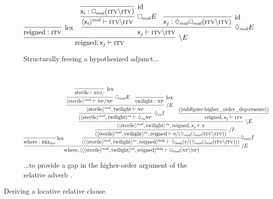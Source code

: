 \begin{figure}
	\begin{subfigure}{1\textwidth}
		\smaller
		\[
			\infer[\divleft E]{\w{reigned}, \varj \vdash \gtype{itv}}{
				\infer[\Lex]{\w{reigned} : \gtype{itv}}{}
				&
				\infer[\ddia{mod}E]{\varj \vdash \gtype{itv}\divleft\gtype{itv}}{
					\infer[\dbox{mod}E]{\dbra{\vari}{mod} \vdash \gtype{itv}\divleft\gtype{itv}}{
						\infer[\Ax]{\vari : \dbox{mod}(\gtype{itv}\divleft\gtype{itv})}{}
					}
					&
					\infer[\Ax]{\varj : \ddia{mod}\dbox{mod}(\gtype{itv}\divleft\gtype{itv})}{}
				}
			}
		\]
		\caption{Structurally freeing a hypothesized adjunct...}	
		\label{subfigure:higher_order_dep:erasure}
	\end{subfigure}\\[\midsep]
	\begin{subfigure}{1\textwidth}
		\smaller
		\[
			\infer[\!\divright E]{\w{where}, \dbra{\dbra{\dbra{\w{sterile}}{mod}, \w{twilight}}{su}, \w{reigned}}{body} \vdash \dbox{mod}(\np\divleft\np)}{
 				\infer[\!\!\Lex]{\w{where} : \subcat{l}{rel}{loc}}{}
				&
				\hspace{-5pt}
				\infer[\!\!\ddia{body}I]{\dbra{\dbra{\dbra{\w{sterile}}{mod}, \w{twilight}}{su}, \w{reigned}}{body} \vdash \ddia{body}(\s\divright(\ddia{mod}\dbox{mod}(\gtype{itv}\divleft\gtype{itv})))}{
					\infer[\divright I]{\dbra{\dbra{\w{sterile}}{mod}, \w{twilight}}{su}, \w{reigned} \vdash \s\divright(\ddia{mod}\dbox{mod}(\gtype{itv}\divleft\gtype{itv}))}{
						\infer[\divleft E]{\dbra{\dbra{\w{sterile}}{mod}, \w{twilight}}{su}, \w{reigned}, \varj \vdash \s}{
							\infer[\ddia{su}I]{\dbra{\dbra{\w{sterile}}{mod}, \w{twilight}}{su} \vdash \ddia{su}\np}{
								\infer[\divright E]{\dbra{\w{sterile}}{mod}, \w{twilight} \vdash \np}{
									\infer[\dbox{mod}E]{\dbra{\w{sterile}}{mod} \vdash \np\divright\np}{
										\infer[\Lex]{\w{sterile} : \gtype{adj}_{\divright}}{}
									}
									&
									\infer[\Lex]{\w{twilight}: \np}{}
								}
							}
							&
							\infer{\w{reigned}, \varj \vdash \gtype{itv}}{\text{(\ref{subfigure:higher_order_dep:erasure})}}
						}
					}
				}
			}
		\]
		\caption{...to provide a gap in the higher-order argument of the relative adverb .}
		\label{subfigure:higher_order_dep:rc}
	\end{subfigure}
	\caption{Deriving a locative relative clause.}
	\label{figure:higher_order_dep}
\end{figure}

